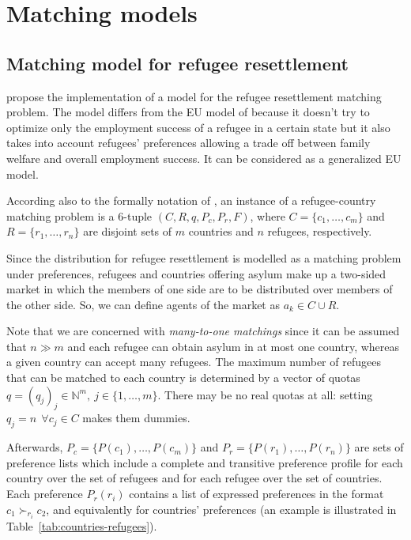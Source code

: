 \section{Matching models}\label{matching-models}%


\subsection{Matching model for refugee resettlement}\label{matching-model-for-refugee-resettlement}%

\citet{olbergml,basshuysen,delacretaz_2020,fernandez} propose the implementation of a model for the refugee resettlement matching problem.
The model differs from the EU model of \citet{basshuysen} because it doesn't try to optimize only the employment success of a refugee in a certain state but it also takes into account refugees' preferences allowing a trade off between family welfare and overall employment success.
It can be considered as a generalized EU model.

According also to the formally notation of \citet{salles}, an instance of a refugee-country matching problem is a 6-tuple \((C, R, q, P_c, P_r, F)\), where \(C = \{c_1, \dots, c_m\}\) and \(R = \{r_1, \dots, r_n\}\) are disjoint sets of \(m\) countries and \(n\) refugees, respectively.

Since the distribution for refugee resettlement is modelled as a matching problem under preferences, refugees and countries offering asylum make up a two-sided market in which the members of one side are to be distributed over members of the other side.
So, we can define agents of the market as \(a_k \in C \cup R\).

Note that we are concerned with \textit{many-to-one matchings} since it can be assumed that \(n \gg m\) and each refugee can obtain asylum in at most one country, whereas a given country can accept many refugees. The maximum number of refugees that can be matched to each country is determined by a vector of quotas \(q = (q_j)_j \in \mathbb{N}^m,\ j\in\{1,\dots ,m\}\). There may be no real quotas at all: setting \(q_j = n\ \ \forall c_j \in C\) makes them dummies.

Afterwards, \(P_c = \{P(c_1), \dots, P(c_m)\}\) and \(P_r =\{P(r_1), \dots, P(r_n)\}\) are sets of preference lists which include a complete and transitive preference profile for each country over the set of refugees and for each refugee over the set of countries.
Each preference \(P_r(r_i)\) contains a list of expressed preferences in the format \(c_1 \succ_{r_i} c_2\), and equivalently for countries' preferences (an example is illustrated in Table~\ref{tab:countries-refugees}).

